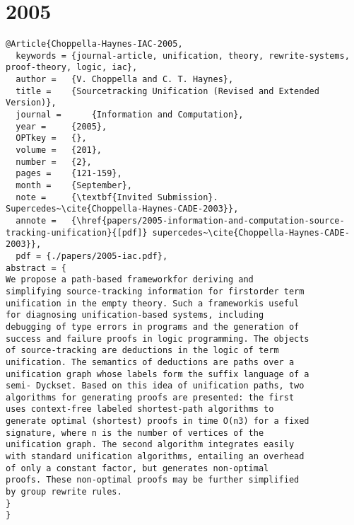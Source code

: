 \documentclass[11pt]{article}
\begin{document}
\section{2005}
\label{sec:orgc5eced0}
\lstset{language=bibtex,label= ,caption= ,captionpos=b,numbers=none}
\begin{lstlisting}
@Article{Choppella-Haynes-IAC-2005,
  keywords = {journal-article, unification, theory, rewrite-systems, proof-theory, logic, iac},
  author = 	 {V. Choppella and C. T. Haynes},
  title = 	 {Sourcetracking Unification (Revised and Extended Version)},
  journal = 	 {Information and Computation},
  year = 	 {2005},
  OPTkey = 	 {},
  volume = 	 {201},
  number = 	 {2},
  pages = 	 {121-159},
  month = 	 {September},
  note = 	 {\textbf{Invited Submission}.  Supercedes~\cite{Choppella-Haynes-CADE-2003}},
  annote = 	 {\href{papers/2005-information-and-computation-source-tracking-unification}{[pdf]} supercedes~\cite{Choppella-Haynes-CADE-2003}},
  pdf = {./papers/2005-iac.pdf},
abstract = {
We propose a path-based frameworkfor deriving and
simplifying source-tracking information for firstorder term
unification in the empty theory. Such a frameworkis useful
for diagnosing unification-based systems, including
debugging of type errors in programs and the generation of
success and failure proofs in logic programming. The objects
of source-tracking are deductions in the logic of term
unification. The semantics of deductions are paths over a
unification graph whose labels form the suffix language of a
semi- Dyckset. Based on this idea of unification paths, two
algorithms for generating proofs are presented: the first
uses context-free labeled shortest-path algorithms to
generate optimal (shortest) proofs in time O(n3) for a fixed
signature, where n is the number of vertices of the
unification graph. The second algorithm integrates easily
with standard unification algorithms, entailing an overhead
of only a constant factor, but generates non-optimal
proofs. These non-optimal proofs may be further simplified
by group rewrite rules.
}
} 


\end{lstlisting}
\end{document}
